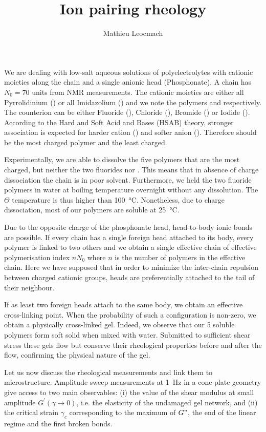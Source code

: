 \documentclass[12pt,a4paper]{article}
\author{Mathieu Leocmach}
\title{Ion pairing rheology}
\begin{document}
\maketitle

We are dealing with low-salt aqueous solutions of polyelectrolytes with cationic moieties along the chain and a single anionic head (Phosphonate). A chain has $N_0 = 70$ units from NMR measurements. The cationic moieties are either all Pyrrolidinium () or all Imidazolium () and we note the polymers  and  respectively. The counterion  can be either Fluoride (), Chloride (), Bromide () or Iodide (). According to the Hard and Soft Acid and Bases (HSAB) theory, stronger association is expected for harder cation () and softer anion (). Therefore  should be the most charged polymer and  the least charged.

Experimentally, we are able to dissolve the five polymers that are the most charged, but neither the two fluorides nor . This means that in absence of charge dissociation the chain is in poor solvent. Furthermore, we held the two fluoride polymers in water at boiling temperature overnight without any dissolution. The $\Theta$ temperature is thus higher than \SI{100}{\celsius}. Nonetheless, due to charge dissociation, most of our polymers are soluble at \SI{25}{\celsius}.

Due to the opposite charge of the phosphonate head, head-to-body ionic bonds are possible. If every chain has a single foreign head attached to its body, every polymer is linked to two others and we obtain a single effective chain of effective polymerisation index $n N_0$ where $n$ is the number of polymers in the effective chain. Here we have supposed that in order to minimize the inter-chain repulsion between charged cationic groups, heads are preferentially attached to the tail of their neighbour.

If as least two foreign heads attach to the same body, we obtain an effective cross-linking point. When the probability of such a configuration is non-zero, we obtain a physically cross-linked gel. Indeed, we observe that our 5 soluble polymers form soft solid when mixed with water. Submitted to sufficient shear stress these gels flow but conserve their rheological properties before and after the flow, confirming the physical nature of the gel.

Let us now discuss the rheological measurements and link them to microstructure. Amplitude sweep measurements at \SI{1}{\hertz} in a cone-plate geometry give access to two main observables: (i) the value of the shear modulus at small amplitude $G^\prime(\gamma\rightarrow 0)$, i.e. the elasticity of the undamaged gel network, and (ii) the critical strain $\gamma_c$ corresponding to the maximum of $G"$, the end of the linear regime and the first broken bonds.
\end{document}
